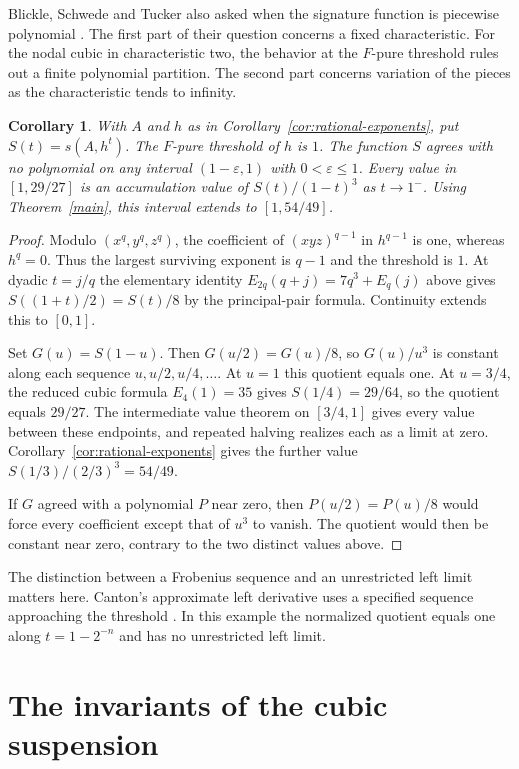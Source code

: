 \documentclass[11pt,a4paper,reqno]{amsart}
\numberwithin{equation}{section}
\theoremstyle{plain}
\newtheorem{corollary}[theorem]{Corollary}
\begin{document}
Blickle, Schwede and Tucker also asked when the signature function is piecewise polynomial \cite[Question~4.8]{BST}. The first part of their question concerns a fixed characteristic. For the nodal cubic in characteristic two, the behavior at the $F$-pure threshold rules out a finite polynomial partition. The second part concerns variation of the pieces as the characteristic tends to infinity.

\begin{corollary}\label{cor:threshold}
With $A$ and $h$ as in Corollary~\ref{cor:rational-exponents}, put $S(t)=s(A,h^t)$. The $F$-pure threshold of $h$ is $1$. The function $S$ agrees with no polynomial on any interval $(1-\varepsilon,1)$ with $0<\varepsilon\le1$. Every value in $[1,29/27]$ is an accumulation value of $S(t)/(1-t)^3$ as $t\to1^-$. Using Theorem~\ref{main}, this interval extends to $[1,54/49]$.
\end{corollary}
\begin{proof}
Modulo $(x^q,y^q,z^q)$, the coefficient of $(xyz)^{q-1}$ in $h^{q-1}$ is one, whereas $h^q=0$. Thus the largest surviving exponent is $q-1$ and the threshold is $1$. At dyadic $t=j/q$ the elementary identity $E_{2q}(q+j)=7q^3+E_q(j)$ above gives $S((1+t)/2)=S(t)/8$ by the principal-pair formula. Continuity extends this to $[0,1]$.

Set $G(u)=S(1-u)$. Then $G(u/2)=G(u)/8$, so $G(u)/u^3$ is constant along each sequence $u, u/2, u/4,\ldots$. At $u=1$ this quotient equals one. At $u=3/4$, the reduced cubic formula $E_4(1)=35$ gives $S(1/4)=29/64$, so the quotient equals $29/27$. The intermediate value theorem on $[3/4,1]$ gives every value between these endpoints, and repeated halving realizes each as a limit at zero. Corollary~\ref{cor:rational-exponents} gives the further value $S(1/3)/(2/3)^3=54/49$.

If $G$ agreed with a polynomial $P$ near zero, then $P(u/2)=P(u)/8$ would force every coefficient except that of $u^3$ to vanish. The quotient would then be constant near zero, contrary to the two distinct values above.
\end{proof}

The distinction between a Frobenius sequence and an unrestricted left limit matters here. Canton's approximate left derivative uses a specified sequence approaching the threshold \cite{Canton}. In this example the normalized quotient equals one along $t=1-2^{-n}$ and has no unrestricted left limit.

\section{The invariants of the cubic suspension}\label{sec:area}
\end{document}
